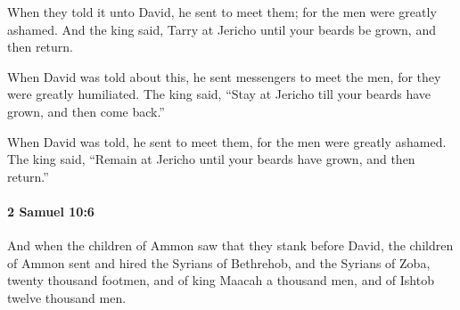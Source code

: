 			\begin{versebox}
					\item[BHS] 
					\item[ASV] When they told it unto David, he sent to meet them; for the men were greatly ashamed. And the king said, Tarry at Jericho until your beards be grown, and then return.
					\item[NIV] When David was told about this, he sent messengers to meet the men, for they were greatly humiliated. The king said, “Stay at Jericho till your beards have grown, and then come back.”
					\item[NRSV] When David was told, he sent to meet them, for the men were greatly ashamed. The king said, “Remain at Jericho until your beards have grown, and then return.”
			\end{versebox}

		\paragraph{2 Samuel 10:6} %
			\label{2SAMUEL-10-6}

			And when the children of Ammon saw that they stank before David, the children of Ammon sent and hired the Syrians of Bethrehob, and the Syrians of Zoba, twenty thousand footmen, and of king Maacah a thousand men, and of Ishtob twelve thousand men.

